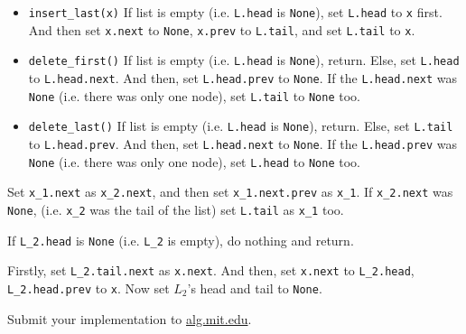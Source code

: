 \documentclass[12pt,twoside]{article}
\begin{document}
\begin{problems}
\begin{problemparts}
\begin{itemize}
  \item \texttt{insert\_last(x)} If list is empty
    (i.e. \texttt{L.head} is \texttt{None}), set \texttt{L.head} to
    \texttt{x} first. And then set \texttt{x.next} to \texttt{None},
    \texttt{x.prev} to \texttt{L.tail}, and set \texttt{L.tail} to
    \texttt{x}.

  \item \texttt{delete\_first()} If list is empty
    (i.e. \texttt{L.head} is \texttt{None}), return. Else, set
    \texttt{L.head} to \texttt{L.head.next}. And then, set
    \texttt{L.head.prev} to \texttt{None}.  If the
    \texttt{L.head.next} was \texttt{None} (i.e. there was only one
    node), set \texttt{L.tail} to \texttt{None} too.

  \item \texttt{delete\_last()} If list is empty (i.e. \texttt{L.head}
    is \texttt{None}), return. Else, set \texttt{L.tail} to
    \texttt{L.head.prev}. And then, set \texttt{L.head.next} to
    \texttt{None}. If the \texttt{L.head.prev} was \texttt{None}
    (i.e. there was only one node), set \texttt{L.head} to
    \texttt{None} too.
  \end{itemize}

  \problempart %
  Set \texttt{x\_1.next} as \texttt{x\_2.next}, and then set
  \texttt{x\_1.next.prev} as \texttt{x\_1}. If \texttt{x\_2.next} was
  \texttt{None}, (i.e. \texttt{x\_2} was the tail of the list) set
  \texttt{L.tail} as \texttt{x\_1} too.

  \problempart %
  If \texttt{L\_2.head} is \texttt{None} (i.e. \texttt{L\_2} is
  empty), do nothing and return.

  Firstly, set \texttt{L\_2.tail.next} as \texttt{x.next}. And then,
  set \texttt{x.next} to \texttt{L\_2.head}, \texttt{L\_2.head.prev}
  to \texttt{x}. Now set $L_2$'s head and tail to \texttt{None}.
  
  \problempart Submit your implementation to {\small\url{alg.mit.edu}}.
\end{problemparts}

\end{problems}
\end{document}
